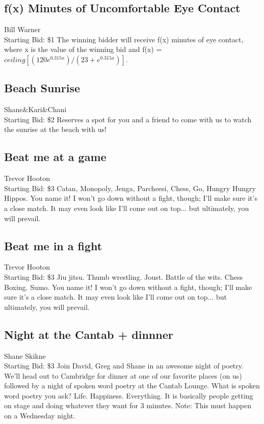 \documentclass[11pt]{article}
\begin{document}
\subsection{f(x) Minutes of Uncomfortable Eye Contact}
Bill Warner
\\
Starting Bid: \$1
\newline
The winning bidder will receive f(x) minutes of eye contact, where x is the value of the winning bid and f(x) = $ceiling[(120e^{0.315x})/(23 + e^{0.315x})]$.
\subsection{Beach Sunrise}
Shane\&Kari\&Chani
\\
Starting Bid: \$2
\newline
Reserves a spot for you and a friend to come with us to watch the sunrise at the beach with us!
\subsection{Beat me at a game}
Trevor Hooton
\\
Starting Bid: \$3
\newline
Catan, Monopoly, Jenga, Parcheesi, Chess, Go, Hungry Hungry Hippos. You name it! 
I won't go down without a fight, though; I'll make sure it's a close match. It may even look like I'll come out on top... but ultimately, you will prevail.
\subsection{Beat me in a fight}
Trevor Hooton
\\
Starting Bid: \$3
\newline
Jiu jitsu. Thumb wrestling. Joust. Battle of the wits. Chess Boxing. Sumo. You name it! 
I won't go down without a fight, though; I'll make sure it's a close match. It may even look like I'll come out on top... but ultimately, you will prevail.
\subsection{Night at the Cantab + dinnner}
Shane Skikne
\\
Starting Bid: \$3
\newline
Join David, Greg and Shane in an awesome night of poetry. We'll head out to Cambridge for dinner at one of our favorite places (on us) followed by a night of spoken word poetry at the Cantab Lounge. What is spoken word poetry you ask? Life. Happiness. Everything. It is basically people getting on stage and doing whatever they want for 3 minutes. Note: This must happen on a Wednesday night.
\end{document}

